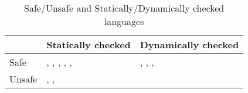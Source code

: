 \begin{table*}[ht]
\footnotesize
\centering
\caption{Safe/Unsafe and Statically/Dynamically checked languages}
\label{table:introduction:langs}
\begin{tabular}{|l||l|l|}
    \hline
            & Statically checked    & Dynamically checked \\
    \hline\hline
    Safe    & \haskell{}, \ml{}, \java{}, \csharp{}, \rust{}, \etc{} & \python{}, \lisp{}, \racket{}, \etc{} \\
    \hline
    Unsafe  & \cc{}, \cpp{}, \etc{} & \\
    \hline
\end{tabular}
\end{table*}
